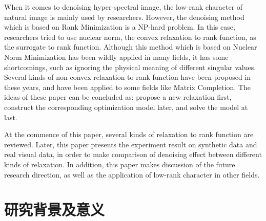\documentclass[12pt, a4paper]{article}
\begin{document}
\par When it comes to denoising hyper-spectral image, the low-rank character of natural image is mainly used by researchers. However, the denoising method which is based on Rank Minimization is a NP-hard problem. In this case, researchers tried to use nuclear norm, the convex relaxation to rank function, as the surrogate to rank function. Although this method which is based on Nuclear Norm Minimization has been wildly applied in many fields, it has some shortcomings, such as ignoring the physical meaning of different singular values. Several kinds of non-convex relaxation to rank function have been proposed in these years, and have been applied to some fields like Matrix Completion. The ideas of these paper can be concluded as: propose a new relaxation first, construct the corresponding optimization model later, and solve the model at last.
\par At the commence of this paper, several kinds of relaxation to rank function are reviewed. Later, this paper presents the experiment result on synthetic data and real visual data, in order to make comparison of denoising effect between different kinds of relaxation. In addition, this paper makes discussion of the future research direction, as well as the application of low-rank character in other fields.
\newpage
{{\tableofcontents}}
\newpage
{}
\pagestyle{fancy}
\lhead{}
\rhead{}
\section{研究背景及意义}
\end{document}
